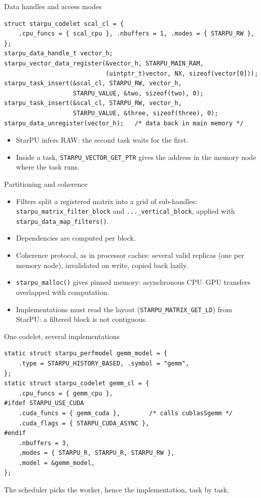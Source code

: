 \documentclass[presentation, aspectratio=169]{beamer}
\begin{document}
\begin{frame}[label={sec:org718c5e3},fragile]{Data handles and access modes}
 \scriptsize
\begin{verbatim}
struct starpu_codelet scal_cl = {
    .cpu_funcs = { scal_cpu }, .nbuffers = 1, .modes = { STARPU_RW },
};
starpu_data_handle_t vector_h;
starpu_vector_data_register(&vector_h, STARPU_MAIN_RAM,
                            (uintptr_t)vector, NX, sizeof(vector[0]));
starpu_task_insert(&scal_cl, STARPU_RW, vector_h,
                   STARPU_VALUE, &two, sizeof(two), 0);
starpu_task_insert(&scal_cl, STARPU_RW, vector_h,
                   STARPU_VALUE, &three, sizeof(three), 0);
starpu_data_unregister(vector_h);   /* data back in main memory */
\end{verbatim}
\normalsize

\begin{itemize}
\item StarPU infers RAW: the second task waits for the first.
\item Inside a task, \texttt{STARPU\_VECTOR\_GET\_PTR} gives the address \alert{in the
memory node where the task runs}.
\end{itemize}
\end{frame}
\begin{frame}[label={sec:orga889ace},fragile]{Partitioning and coherence}
 \begin{itemize}
\item \alert{Filters} split a registered matrix into a grid of sub-handles:
\texttt{starpu\_matrix\_filter\_block} and \texttt{...\_vertical\_block}, applied with
\texttt{starpu\_data\_map\_filters()}.
\item Dependencies are computed \alert{per block}.
\item Coherence protocol, as in processor caches: several valid replicas
(one per memory node), invalidated on write, copied back lazily.
\item \texttt{starpu\_malloc()} gives pinned memory: asynchronous CPU--GPU
transfers overlapped with computation.
\item Implementations must read the layout (\texttt{STARPU\_MATRIX\_GET\_LD}) from
StarPU: a filtered block is not contiguous.
\end{itemize}
\end{frame}
\begin{frame}[label={sec:orgd9dae3f},fragile]{One codelet, several implementations}
 \scriptsize
\begin{verbatim}
static struct starpu_perfmodel gemm_model = {
    .type = STARPU_HISTORY_BASED, .symbol = "gemm",
};
static struct starpu_codelet gemm_cl = {
    .cpu_funcs = { gemm_cpu },
#ifdef STARPU_USE_CUDA
    .cuda_funcs = { gemm_cuda },        /* calls cublasSgemm */
    .cuda_flags = { STARPU_CUDA_ASYNC },
#endif
    .nbuffers = 3,
    .modes = { STARPU_R, STARPU_R, STARPU_RW },
    .model = &gemm_model,
};
\end{verbatim}
\normalsize

The scheduler picks the worker, hence the implementation, task by task.
\end{frame}
\end{document}
